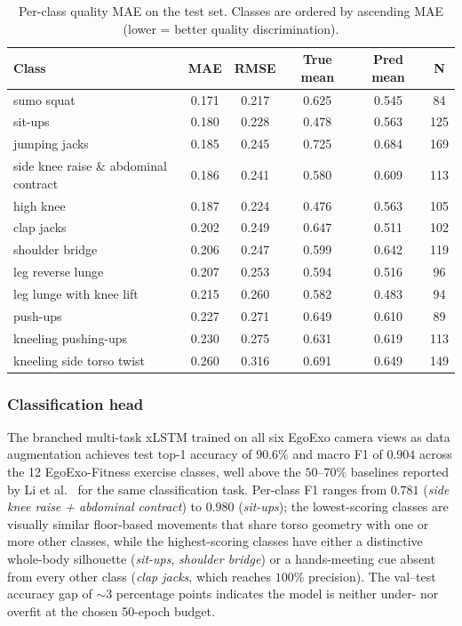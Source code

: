 \documentclass[conference,onecolumn,oneside]{IEEEtran}
\begin{document}
\begin{table}[H]
\centering
\caption{Per-class quality MAE on the test set. Classes are ordered by
ascending MAE (lower = better quality discrimination).}
\label{tab:multitask_quality_per_class}
\small
\renewcommand{\arraystretch}{1.10}
\begin{tabular}{|l|c|c|c|c|c|}
\hline
\textbf{Class} & \textbf{MAE} & \textbf{RMSE} & \textbf{True mean} & \textbf{Pred mean} & \textbf{N} \\
\hline
sumo squat                              & 0.171 & 0.217 & 0.625 & 0.545 & 84  \\
sit-ups                                 & 0.180 & 0.228 & 0.478 & 0.563 & 125 \\
jumping jacks                           & 0.185 & 0.245 & 0.725 & 0.684 & 169 \\
side knee raise \& abdominal contract   & 0.186 & 0.241 & 0.580 & 0.609 & 113 \\
high knee                               & 0.187 & 0.224 & 0.476 & 0.563 & 105 \\
clap jacks                              & 0.202 & 0.249 & 0.647 & 0.511 & 102 \\
shoulder bridge                         & 0.206 & 0.247 & 0.599 & 0.642 & 119 \\
leg reverse lunge                       & 0.207 & 0.253 & 0.594 & 0.516 & 96  \\
leg lunge with knee lift                & 0.215 & 0.260 & 0.582 & 0.483 & 94  \\
push-ups                                & 0.227 & 0.271 & 0.649 & 0.610 & 89  \\
kneeling pushing-ups                    & 0.230 & 0.275 & 0.631 & 0.619 & 113 \\
kneeling side torso twist               & 0.260 & 0.316 & 0.691 & 0.649 & 149 \\
\hline
\end{tabular}
\end{table}

\subsubsection{Classification head}
The branched multi-task xLSTM trained on all six EgoExo camera views as
data augmentation achieves test top-1 accuracy of $90.6\%$ and macro
F1 of $0.904$ across the 12 EgoExo-Fitness exercise classes, well
above the $50$--$70\%$ baselines reported by Li et
al.~\cite{2} for the same classification task. Per-class F1 ranges
from $0.781$ (\emph{side knee raise + abdominal contract}) to $0.980$
(\emph{sit-ups}); the lowest-scoring classes are visually similar
floor-based movements that share torso geometry with one or more
other classes, while the highest-scoring classes have either a
distinctive whole-body silhouette (\emph{sit-ups}, \emph{shoulder
bridge}) or a hands-meeting cue absent from every other class
(\emph{clap jacks}, which reaches $100\%$ precision). The val--test
accuracy gap of $\sim 3$ percentage points indicates the model is
neither under- nor overfit at the chosen 50-epoch budget.
\end{document}
